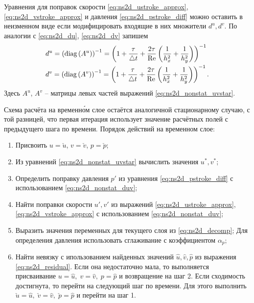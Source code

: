 Уравнения для поправок скорости \eqref{eq:ns2d_ustroke_approx}, \eqref{eq:ns2d_vstroke_approx}
и давления \eqref{eq:ns2d_pstroke_diff}
можно оставить в неизменном виде если модифицировать входящие в них множители $d^u, d^v$.
По аналогии с \eqref{eq:ns2d_du}, \eqref{eq:ns2d_dv} запишем
\begin{equation}
    \label{eq:ns2d_nonstat_duv}
    \begin{array}{l}
    \displaystyle
    d^u = \left({\rm diag}\left(A^u\right)\right)^{-1} = 
        \left(1 + \frac\tau{\triangle t} + \frac{2\tau}{\mathrm{Re}}\left(\frac{1}{h_x^2} + \frac{1}{h_y^2}\right)\right)^{-1} \\[10pt]
    \displaystyle
    d^v = \left({\rm diag}\left(A^v\right) \right)^{-1}= 
        \left(1 + \frac\tau{\triangle t} + \frac{2\tau}{\mathrm{Re}}\left(\frac{1}{h_x^2} + \frac{1}{h_y^2}\right)\right)^{-1}.
    \end{array}
\end{equation}
Здесь $A^u$, $A^v$ -- матрицы левых частей выражений \eqref{eq:ns2d_nonstat_uvstar}.

Схема расчёта на временн\'{о}м слое остаётся аналогичной стационарному случаю,
с той разницей, что первая итерация использует значение расчётных полей
с предыдущего шага по времени.
Порядок действий на временном слое:

\begin{enumerate}
\item Присвоить $u=\check u$, $v=\check v$, $p=\check p$;
\item Из уравнений \eqref{eq:ns2d_nonstat_uvstar}
      вычислить значения $u^*, v^*$;
\item Определить поправку давления $p'$ из уравнения \eqref{eq:ns2d_pstroke_diff} с использованием \eqref{eq:ns2d_nonstat_duv};
\item Найти поправки скорости $u', v'$ из выражений \eqref{eq:ns2d_ustroke_approx}, \eqref{eq:ns2d_vstroke_approx} с использованием \eqref{eq:ns2d_nonstat_duv};
\item Выразить значения переменных для текущего слоя из \eqref{eq:ns2d_decomp};
      Для определения давления использовать сглаживание с коэффициентом $\alpha_p$;
\item Найти невязку с ипользованием найденных значений $\hat u, \hat v, \hat p$
      из выражения \eqref{eq:ns2d_residual}.
      Если она недостаточно мала, то выполняется присваивание
      $u = \hat u, \; v=\hat v, \; p = \hat p$ 
      и возвращение на шаг 2.
      Если сходимость достигнута, то перейти на следующий шаг по времени.
      Для этого выполнить
      $\check u = \hat u, \; \check v= \hat v, \; \check p = \hat p$ 
      и перейти на шаг 1.
\end{enumerate}


